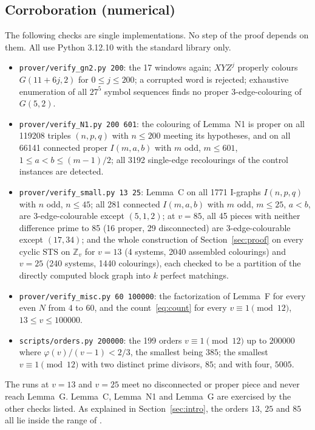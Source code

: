 \documentclass[11pt]{amsart}
\theoremstyle{plain}
\theoremstyle{definition}
\theoremstyle{remark}
\numberwithin{equation}{section}
\newcommand{\Z}{\mathbb{Z}}
\newcommand{\STS}{\mathrm{STS}}
\newcommand{\ttt}[1]{\texttt{#1}}
\begin{document}
\subsection{Corroboration (numerical)}
The following checks are single implementations. No step of the proof depends on them. All use Python 3.12.10 with the standard library only.
\begin{itemize}
\item \ttt{prover/verify\_gn2.py 200}: the 17 windows again; \(XYZ^j\) properly colours \(G(11+6j,2)\) for \(0\le j\le200\); a corrupted word is rejected; exhaustive enumeration of all \(27^5\) symbol sequences finds no proper \(3\)-edge-colouring of \(G(5,2)\).
\item \ttt{prover/verify\_N1.py 200 601}: the colouring of Lemma~N1 is proper on all 119208 triples \((n,p,q)\) with \(n\le200\) meeting its hypotheses, and on all 66141 connected proper \(I(m,a,b)\) with \(m\) odd, \(m\le601\), \(1\le a<b\le(m-1)/2\); all 3192 single-edge recolourings of the control instances are detected.
\item \ttt{prover/verify\_small.py 13 25}: Lemma~C on all 1771 I-graphs \(I(n,p,q)\) with \(n\) odd, \(n\le45\); all 281 connected \(I(m,a,b)\) with \(m\) odd, \(m\le25\), \(a<b\), are \(3\)-edge-colourable except \((5,1,2)\); at \(v=85\), all 45 pieces with neither difference prime to 85 (16 proper, 29 disconnected) are \(3\)-edge-colourable except \((17,34)\); and the whole construction of Section~\ref{sec:proof} on every cyclic \(\STS\) on \(\Z_v\) for \(v=13\) (4 systems, 2040 assembled colourings) and \(v=25\) (240 systems, 1440 colourings), each checked to be a partition of the directly computed block graph into \(k\) perfect matchings.
\item \ttt{prover/verify\_misc.py 60 100000}: the factorization of Lemma~F for every even \(N\) from \(4\) to \(60\), and the count~\eqref{eq:count} for every \(v\equiv1\pmod{12}\), \(13\le v\le100000\).
\item \ttt{scripts/orders.py 200000}: the 199 orders \(v\equiv1\pmod{12}\) up to \(200000\) where \(\varphi(v)/(v-1)<2/3\), the smallest being \(385\); the smallest \(v\equiv1\pmod{12}\) with two distinct prime divisors, \(85\); and with four, \(5005\).
\end{itemize}
The runs at \(v=13\) and \(v=25\) meet no disconnected or proper piece and never reach Lemma~G. Lemma~C, Lemma~N1 and Lemma~G are exercised by the other checks listed. As explained in Section~\ref{sec:intro}, the orders \(13\), \(25\) and \(85\) all lie inside the range of \cite[Theorem~3.1]{DPP}.
\end{document}
